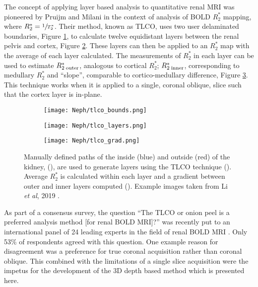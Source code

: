 The concept of applying layer based analysis to quantitative renal \ac{MRI} was pioneered by Pruijm and Milani \cite{piskunowicz_new_2015, milani_reduction_2017, pruijm_blood_2017, li_renal_2019} in the context of analysis of \ac{BOLD} $R_2^*$ mapping, where $R_2^*=\sfrac{1}{T_2^*}$. Their method, known as \ac{TLCO}, uses two user delaminated boundaries, Figure \ref{fig:ex_tlco_bounds}, to calculate twelve equidistant layers between the renal pelvis and cortex, Figure \ref{fig:ex_tlco_layers}. These layers can then be applied to an $R_2^*$ map with the average of each layer calculated. The measurements of $R_2^*$ in each layer can be used to estimate $R_{2\;\textup{outer}}^*$, analogous to cortical $R_2^*$; $R_{2\;\textup{inner}}^*$, corresponding to medullary $R_2^*$ and ``slope'', comparable to  cortico-medullary difference, Figure \ref{fig:ex_tlco_grad}. This technique works when it is applied to a single, coronal oblique, slice such that the cortex layer is in-plane.

\begin{figure}[H]
	\centering
	\begin{subfigure}[c]{0.23\textwidth}
		\centering
		\texttt{[image: Neph/tlco\_bounds.png]}
		\caption{}
		\label{fig:ex_tlco_bounds}
	\end{subfigure}
	\hfill
	\begin{subfigure}[c]{0.23\textwidth}
		\centering
		\texttt{[image: Neph/tlco\_layers.png]}
		\caption{}
		\label{fig:ex_tlco_layers}
	\end{subfigure}
	\hfill
	\begin{subfigure}[c]{0.47\textwidth}
		\centering
		\texttt{[image: Neph/tlco\_grad.png]}
		\caption{}
		\label{fig:ex_tlco_grad}
	\end{subfigure}
	\caption{Manually defined paths of the inside (blue) and outside (red) of the kidney, (), are used to generate layers using the \ac{TLCO} technique (). Average $R_2^*$ is calculated within each layer and a gradient between outer and inner layers computed (). Example images taken from Li \textit{et al}, 2019 \cite{li_renal_2019}.}
	\label{fig:ex_tlco}
\end{figure}

As part of a consensus survey, the question ``The \ac{TLCO} or onion peel is a preferred analysis method [for renal \ac{BOLD} \ac{MRI}]?'' was recently put to an international panel of 24 leading experts in the field of renal \ac{BOLD} \ac{MRI} \cite{bane_consensus-based_2020}. Only 53\% of respondents agreed with this question. One example reason for disagreement was a preference for true coronal acquisition rather than coronal oblique. This combined with the limitations of a single slice acquisition were the impetus for the development of the 3D depth based method which is presented here.

